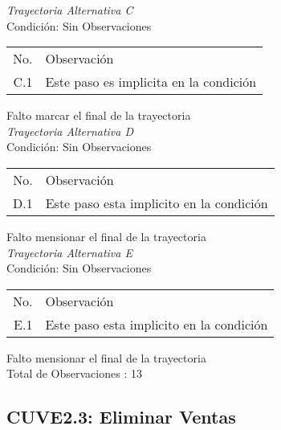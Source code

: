 \documentclass[10pt,spanish]{article}
\providecommand{\tabularnewline}{\\}
\begin{document}
\textit{Trayectoria Alternativa C}\tabularnewline
Condición: Sin Observaciones\tabularnewline
\begin{longtable}{rp{8cm}}
No.  & Observación\tabularnewline
C.1  & Este paso es implicita en la condición\tabularnewline
\end{longtable}
Falto marcar el final de la trayectoria\tabularnewline


\textit{Trayectoria Alternativa D} \tabularnewline
Condición: Sin Observaciones\tabularnewline
\begin{longtable}{rp{8cm}}
No.  & Observación\tabularnewline
D.1  & Este paso esta implicito en la condición\tabularnewline
\end{longtable}
Falto mensionar el final de la trayectoria \tabularnewline
\textit{Trayectoria Alternativa E}\tabularnewline
Condición: Sin Observaciones\tabularnewline
\begin{longtable}{rp{8cm}}
No.  & Observación\tabularnewline
E.1  & Este paso esta implicito en la condición\tabularnewline
\end{longtable}
Falto mensionar el final de la trayectoria \tabularnewline
Total de Observaciones : 13\tabularnewline
\subsection{CUVE2.3: Eliminar Ventas}
\end{document}

